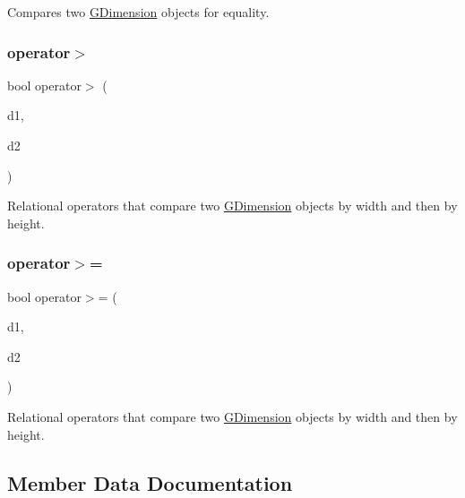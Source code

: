 Compares two \mbox{\hyperlink{structGDimension}{G\+Dimension}} objects for equality. 

\mbox{\label{structGDimension_a9a2ff65ec3535534d2087f7a29ddf1e8}} 
\subsubsection{\texorpdfstring{operator$>$}{operator>}}
{\footnotesize\ttfamily bool operator$>$ (\begin{DoxyParamCaption}\item[{const \mbox{\hyperlink{structGDimension}{G\+Dimension}} \&}]{d1,  }\item[{const \mbox{\hyperlink{structGDimension}{G\+Dimension}} \&}]{d2 }\end{DoxyParamCaption})\hspace{0.3cm}{\ttfamily [friend]}}



Relational operators that compare two \mbox{\hyperlink{structGDimension}{G\+Dimension}} objects by width and then by height. 

\mbox{\label{structGDimension_a52915605adf1b94cbc876aa6b819b70d}} 
\subsubsection{\texorpdfstring{operator$>$=}{operator>=}}
{\footnotesize\ttfamily bool operator$>$= (\begin{DoxyParamCaption}\item[{const \mbox{\hyperlink{structGDimension}{G\+Dimension}} \&}]{d1,  }\item[{const \mbox{\hyperlink{structGDimension}{G\+Dimension}} \&}]{d2 }\end{DoxyParamCaption})\hspace{0.3cm}{\ttfamily [friend]}}



Relational operators that compare two \mbox{\hyperlink{structGDimension}{G\+Dimension}} objects by width and then by height. 



\subsection{Member Data Documentation}
\mbox{\label{structGDimension_a89f6abd564014faeff7cd20c340a9c7d}} 
